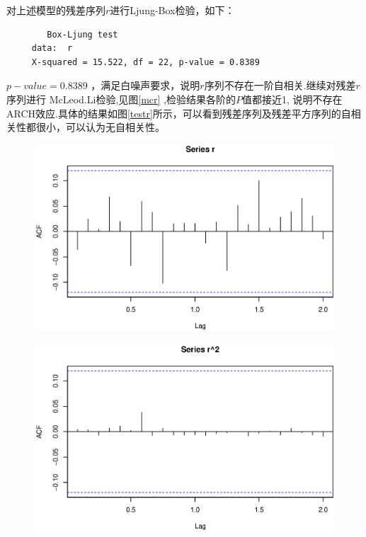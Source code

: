 对上述模型的残差序列$r$进行Ljung-Box检验，如下：
\begin{framed}
\begin{verbatim} 
 	 	Box-Ljung test	 
 	 data:  r
 	 X-squared = 15.522, df = 22, p-value = 0.8389
\end{verbatim}
\end{framed}
$p-value=0.8389$ ，满足白噪声要求，说明$r$序列不存在一阶自相关.继续对残差$r$序列进行 McLeod.Li检验,见图\ref{mcr} ,检验结果各阶的$P$值都接近1, 说明不存在ARCH效应.具体的结果如图\ref{testr}所示，可以看到残差序列及残差平方序列的自相关性都很小，可以认为无自相关性。
\begin{figure}[h!]
	\begin{minipage}[ht]{0.31\textwidth}
		\centering
		\includegraphics[width=\textwidth]{pic/ast/acfr}
		\subcaption{}\label{acfr}
	\end{minipage}%
	\hspace{0.02\textwidth}
	\begin{minipage}[ht]{0.31\textwidth}
		\centering
		\includegraphics[width=\textwidth]{pic/ast/acfr2}

\end{minipage}
\end{figure}
